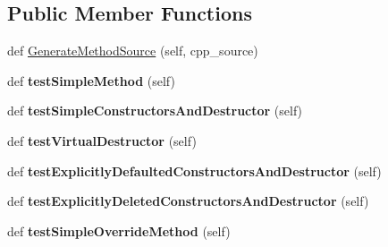 \subsection*{Public Member Functions}
\begin{DoxyCompactItemize}
\item 
def \hyperlink{classcpp_1_1gmock__class__test_1_1_generate_methods_test_af96a6c9fd394f7e27cf24f86814549c9}{Generate\+Method\+Source} (self, cpp\+\_\+source)
\item 
\mbox{\label{classcpp_1_1gmock__class__test_1_1_generate_methods_test_a3ece43a88823e3fe1b4731819505bd61}} 
def {\bfseries test\+Simple\+Method} (self)
\item 
\mbox{\label{classcpp_1_1gmock__class__test_1_1_generate_methods_test_abb0adf9fa7afd25d63964a9075af1414}} 
def {\bfseries test\+Simple\+Constructors\+And\+Destructor} (self)
\item 
\mbox{\label{classcpp_1_1gmock__class__test_1_1_generate_methods_test_a3095f7046a089b3c8a13e7e8161a2ab2}} 
def {\bfseries test\+Virtual\+Destructor} (self)
\item 
\mbox{\label{classcpp_1_1gmock__class__test_1_1_generate_methods_test_a0a2a15e9eb43aff0fec7e89a81c30987}} 
def {\bfseries test\+Explicitly\+Defaulted\+Constructors\+And\+Destructor} (self)
\item 
\mbox{\label{classcpp_1_1gmock__class__test_1_1_generate_methods_test_a4e6c2d2de1e21e63672ebbb75676c45c}} 
def {\bfseries test\+Explicitly\+Deleted\+Constructors\+And\+Destructor} (self)
\item 
\mbox{\label{classcpp_1_1gmock__class__test_1_1_generate_methods_test_a2b1501cf9517acbeb48d11e9d8992a9b}} 
def {\bfseries test\+Simple\+Override\+Method} (self)
\item 
\mbox{\label{classcpp_1_1gmock__class__test_1_1_generate_methods_test_ad8cb9c2f99fa65c7d3fee054dde0e30d}} 

\end{DoxyCompactItemize}
